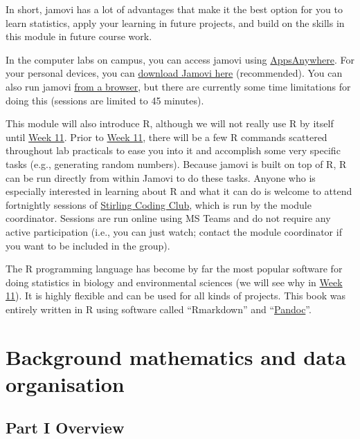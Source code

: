 \documentclass[
]{scrbook}
\begin{document}
In short, jamovi has a lot of advantages that make it the best option for you to learn statistics, apply your learning in future projects, and build on the skills in this module in future course work.

In the computer labs on campus, you can access jamovi using \href{https://appsanywhere.stir.ac.uk/}{AppsAnywhere}.
For your personal devices, you can \href{https://www.jamovi.org/download.html}{download Jamovi here} (recommended).
You can also run jamovi \href{https://www.jamovi.org/cloud.html}{from a browser}, but there are currently some time limitations for doing this (sessions are limited to 45 minutes).

This module will also introduce R, although we will not really use R by itself until \protect\hyperlink{Week_11}{Week 11}.
Prior to \protect\hyperlink{Week_11}{Week 11}, there will be a few R commands scattered throughout lab practicals to ease you into it and accomplish some very specific tasks (e.g., generating random numbers).
Because jamovi is built on top of R, R can be run directly from within Jamovi to do these tasks.
Anyone who is especially interested in learning about R and what it can do is welcome to attend fortnightly sessions of \href{https://stirlingcodingclub.github.io/studyGroup/}{Stirling Coding Club}, which is run by the module coordinator.
Sessions are run online using MS Teams and do not require any active participation (i.e., you can just watch; contact the module coordinator if you want to be included in the group).

The R programming language has become by far the most popular software for doing statistics in biology and environmental sciences (we will see why in \protect\hyperlink{Week_11}{Week 11}).
It is highly flexible and can be used for all kinds of projects.
This book was entirely written in R using software called ``Rmarkdown'' and ``\href{https://pandoc.org/}{Pandoc}''.

\hypertarget{part-background-mathematics-and-data-organisation}{%
\part{Background mathematics and data organisation}\label{part-background-mathematics-and-data-organisation}}

\hypertarget{Week1}{%
\chapter*{Part I Overview}\label{Week1}}
\end{document}
